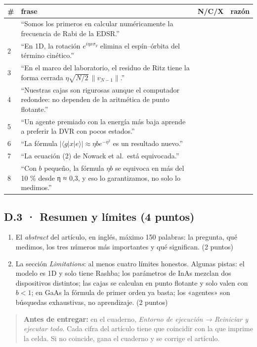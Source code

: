 \begin{longtable}[]{@{}p{0.5cm}p{8.7cm}p{1.2cm}p{4.1cm}@{}}
\toprule
\# & frase & N/C/X & razón \\
\midrule
\endhead
\bottomrule
\endlastfoot
1 & ``Somos los primeros en calcular numéricamente la frecuencia de Rabi de la EDSR.'' & & \\
2 & ``En 1D, la rotación $e^{i\eta x\sigma_y}$ elimina el espín--órbita del término cinético.'' & & \\
3 & ``En el marco del laboratorio, el residuo de Ritz tiene la forma cerrada $\eta\sqrt{N/2}\,\|v_{N-1}\|$.'' & & \\
4 & ``Nuestras cajas son rigurosas aunque el computador redondee: no dependen de la aritmética de punto flotante.'' & & \\
5 & ``Un agente premiado con la energía más baja aprende a preferir la DVR con pocos estados.'' & & \\
6 & ``La fórmula $|\langle g|x|e\rangle| \approx \eta b e^{-\eta^2}$ es un resultado nuevo.'' & & \\
7 & ``La ecuación (2) de Nowack et al.\ está equivocada.'' & & \\
8 & ``Con $b$ pequeño, la fórmula $\eta b$ se equivoca en más del 10 \% desde η ≈ 0,3, y eso lo garantizamos, no solo lo medimos.'' & & \\
\end{longtable}

\subsection{D.3 · Resumen y límites (4 puntos)}

\begin{enumerate}
\def\labelenumi{(\alph{enumi})}
\item El \emph{abstract} del artículo, en inglés, máximo 150 palabras: la pregunta, qué medimos, los tres números más importantes y qué significan. (2 puntos)
\item La sección \emph{Limitations}: al menos cuatro límites honestos. Algunas pistas: el modelo es 1D y solo tiene Rashba; los parámetros de InAs mezclan dos dispositivos distintos; las cajas se calculan en punto flotante y solo valen con $b < 1$; en GaAs la fórmula de primer orden ya basta; los «agentes» son búsquedas exhaustivas, no aprendizaje. (2 puntos)
\end{enumerate}

\begin{quote}
\textbf{Antes de entregar:} en el cuaderno, \emph{Entorno de ejecución → Reiniciar y ejecutar todo}. Cada cifra del artículo tiene que coincidir con la que imprime la celda. Si no coincide, gana el cuaderno y se corrige el artículo.
\end{quote}

